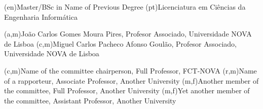 \ntauthordegree(en){Master/BSc in Name of Previous Degree}
\ntauthordegree(pt){Licenciatura em Ciências da Engenharia Informática}


(a,m){João Carlos Gomes Moura Pires, Profesor Associado, Universidade NOVA de Lisboa}
(c,m){Miguel Carlos Pacheco Afonso Goulão, Profesor Associado, Universidade NOVA de Lisboa}

(c,m){Name of the committee chairperson, Full Professor, FCT-NOVA}
(r,m){Name of a rapporteur, Associate Professor, Another University}
(m,f){Another member of the committee, Full Professor, Another University}
(m,f){Yet another member of the committee, Assistant Professor, Another University}
